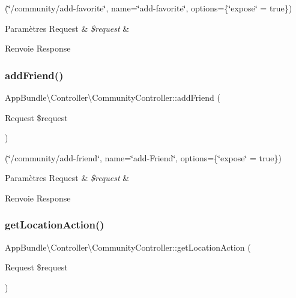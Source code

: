 (\char`\"{}/community/add-\/favorite\char`\"{}, name=\char`\"{}add-\/favorite\char`\"{}, options=\{\char`\"{}expose\char`\"{} = true\}) 
\begin{DoxyParams}[1]{Paramètres}
Request & {\em \$request} & \\
\hline
\end{DoxyParams}
\begin{DoxyReturn}{Renvoie}
Response 
\end{DoxyReturn}
\mbox{\label{classAppBundle_1_1Controller_1_1CommunityController_af9281a620be8afbfebcef4910ede38fa}} 
\subsubsection{\texorpdfstring{add\+Friend()}{addFriend()}}
{\footnotesize\ttfamily App\+Bundle\textbackslash{}\+Controller\textbackslash{}\+Community\+Controller\+::add\+Friend (\begin{DoxyParamCaption}\item[{Request}]{\$request }\end{DoxyParamCaption})}

(\char`\"{}/community/add-\/friend\char`\"{}, name=\char`\"{}add-\/\+Friend\char`\"{}, options=\{\char`\"{}expose\char`\"{} = true\}) 
\begin{DoxyParams}[1]{Paramètres}
Request & {\em \$request} & \\
\hline
\end{DoxyParams}
\begin{DoxyReturn}{Renvoie}
Response 
\end{DoxyReturn}
\mbox{\label{classAppBundle_1_1Controller_1_1CommunityController_a0dda1cbb4b9bb323a51ff7c819f32290}} 
\subsubsection{\texorpdfstring{get\+Location\+Action()}{getLocationAction()}}
{\footnotesize\ttfamily App\+Bundle\textbackslash{}\+Controller\textbackslash{}\+Community\+Controller\+::get\+Location\+Action (\begin{DoxyParamCaption}\item[{Request}]{\$request }\end{DoxyParamCaption})}

